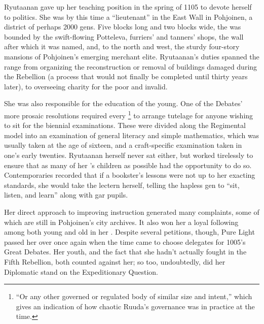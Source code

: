 \documentclass[12pt]{report}
\begin{document}
Ryutaanan gave up her teaching position in the spring of 1105 to
devote herself to politics.  She was by this time a ``lieutenant'' in
the East Wall  in Pohjoinen, a district of perhaps 2000
gens.  Five blocks long and two blocks wide, the  was
bounded by the swift-flowing Potteleva, furriers' and tanners' shops,
the wall after which it was named, and, to the north and west, the
sturdy four-story mansions of Pohjoinen's emerging merchant elite.
Ryutaanan's duties spanned the range from organizing the
reconstruction or removal of buildings damaged during the Rebellion (a
process that would not finally be completed until thirty years later),
to overseeing charity for the poor and invalid.

She was also responsible for the education of the young.  One of the
Debates' more prosaic resolutions required every
\footnote{``Or any other governed or regulated body of
similar size and intent,'' which gives an indication of how chaotic
Ruuda's governance was in practice at the time.} to arrange tutelage
for anyone wishing to sit for the biennial examinations.  These were
divided along the Regimental model into an examination of general
literacy and simple mathematics, which was usually taken at the age of
sixteen, and a craft-specific examination taken in one's early
twenties.  Ryutaanan herself never sat either, but worked tirelessly
to ensure that as many of her 's children as possible
had the opportunity to do so.  Contemporaries recorded that if a
bookster's lessons were not up to her exacting standards, she would
take the lectern herself, telling the hapless gen to ``sit, listen, and
learn'' along with gar pupils.

Her direct approach to improving instruction generated many
complaints, some of which are still in Pohjoinen's city archives.  It
also won her a loyal following among both young and old in her
.  Despite several petitions, though, Pure Light passed
her over once again when the time came to choose delegates for 1005's
Great Debates.  Her youth, and the fact that she hadn't actually
fought in the Fifth Rebellion, both counted against her; so too,
undoubtedly, did her Diplomatic stand on the Expeditionary Question.
\end{document}
